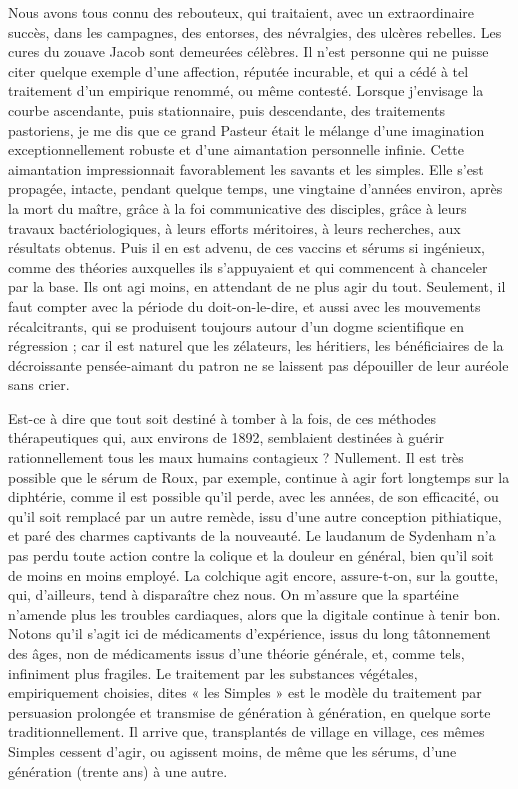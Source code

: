 \documentclass[french,twoside]{book} %
\begin{document}
Nous avons tous connu des rebouteux, qui traitaient, avec un extraordinaire succès, dans les campagnes, des entorses, des névralgies, des ulcères rebelles. Les cures du zouave Jacob sont demeurées célèbres. Il n’est personne qui ne puisse citer quelque exemple d’une affection, réputée incurable, et qui a cédé à tel traitement d’un empirique renommé, ou même contesté. Lorsque j’envisage la courbe ascendante, puis stationnaire, puis descendante, des traitements pastoriens, je me dis que ce grand Pasteur était le mélange d’une imagination exceptionnellement robuste et d’une aimantation personnelle infinie. Cette aimantation impressionnait favorablement les savants et les simples. Elle s’est propagée, intacte, pendant quelque temps, une vingtaine d’années environ, après la mort du maître, grâce à la foi communicative des disciples, grâce à leurs travaux bactériologiques, à leurs efforts méritoires, à leurs recherches, aux résultats obtenus. Puis il en est advenu, de ces vaccins et sérums si ingénieux, comme des théories auxquelles ils s’appuyaient et qui commencent à chanceler par la base. Ils ont agi moins, en attendant de ne plus agir du tout. Seulement, il faut compter avec la période du doit-on-le-dire, et aussi avec les mouvements récalcitrants, qui se produisent toujours autour d’un dogme scientifique en régression ; car il est naturel que les zélateurs, les héritiers, les bénéficiaires de la décroissante pensée-aimant du patron ne se laissent pas dépouiller de leur auréole sans crier.\par
Est-ce à dire que tout soit destiné à tomber à la fois, de ces méthodes thérapeutiques qui, aux environs de 1892, semblaient destinées à guérir rationnellement tous les maux humains contagieux ? Nullement. Il est très possible que le sérum de Roux, par exemple, continue à agir fort longtemps sur la diphtérie, comme il est possible qu’il perde, avec les années, de son efficacité, ou qu’il soit remplacé par un autre remède, issu d’une autre conception pithiatique, et paré des charmes captivants de la nouveauté. Le laudanum de Sydenham n’a pas perdu toute action contre la colique et la douleur en général, bien qu’il soit de moins en moins employé. La colchique agit encore, assure-t-on, sur la goutte, qui, d’ailleurs, tend à disparaître chez nous. On m’assure que la spartéine n’amende plus les troubles cardiaques, alors que la digitale continue à tenir bon. Notons qu’il s’agit ici de médicaments d’expérience, issus du long tâtonnement des âges, non de médicaments issus d’une théorie générale, et, comme tels, infiniment plus fragiles. Le traitement par les substances végétales, empiriquement choisies, dites « les Simples » est le modèle du traitement par persuasion prolongée et transmise de génération à génération, en quelque sorte traditionnellement. Il arrive que, transplantés de village en village, ces mêmes Simples cessent d’agir, ou agissent moins, de même que les sérums, d’une génération (trente ans) à une autre.\par
\end{document}
